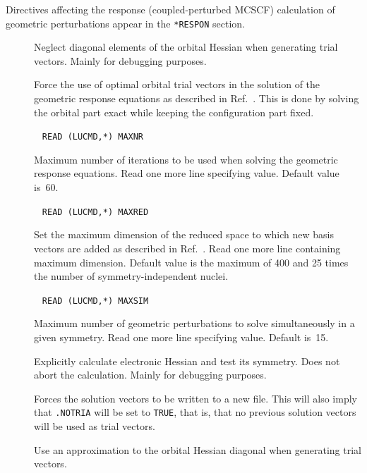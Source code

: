 Directives affecting the response (coupled-perturbed MCSCF)
calculation of geometric perturbations appear in the \verb|*RESPON| section.
\begin{description}
\item[] Neglect diagonal elements of the orbital
Hessian when generating trial vectors. Mainly for debugging
purposes.

\item[] Force the use of optimal orbital
trial vectors in
the solution of the geometric response equations as described in
Ref.~\cite{tuhjahjajpjjcp84}. This is done by solving the orbital part
exact while keeping the configuration part fixed.

\item[]\verb| |\newline
\verb|READ (LUCMD,*) MAXNR|

Maximum number of iterations to be used when solving the geometric
response equations.  Read one more line specifying value.
Default value is~60.

\item[]\verb| |\newline
\verb|READ (LUCMD,*) MAXRED|

Set the maximum dimension of the reduced space to which new basis
vectors are added as described in Ref.~\cite{tuhjahjajpjjcp84}. Read
one more line containing maximum dimension. Default value is the
maximum of 400 and 25 times the number of symmetry-independent nuclei.

\item[]\verb| |\newline
\verb|READ (LUCMD,*) MAXSIM|

Maximum number of geometric perturbations to solve simultaneously in a
given symmetry.  Read one more line specifying value.  Default
is~15.

\item[] Explicitly calculate electronic Hessian and
test its symmetry. Does not abort the calculation. Mainly for
debugging purposes.

\item[] Forces the solution vectors to be written to a
new file. This will also imply that \verb|.NOTRIA| will be set to
\verb|TRUE|, that is, that no previous solution vectors will be used
as trial vectors.

\item[] Use an approximation to the orbital Hessian
diagonal when generating trial vectors.


\end{description}
